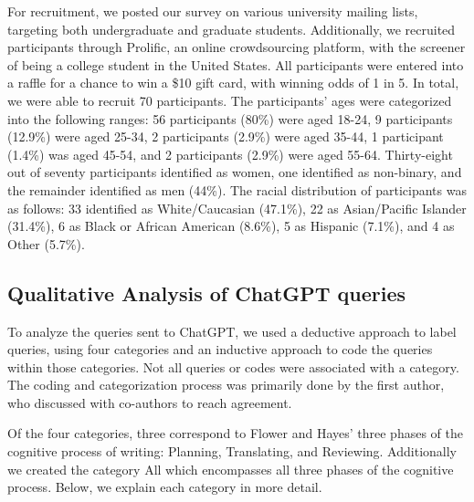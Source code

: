 \documentclass[manuscript,screen,acmsmall]{acmart}
\begin{document}
For recruitment, we posted our survey on various university mailing lists, targeting both undergraduate and graduate students. Additionally, we recruited participants through Prolific, an online crowdsourcing platform, with the screener of being a college student in the United States. All participants were entered into a raffle for a chance to win a \$10 gift card, with winning odds of 1 in 5. In total, we were able to recruit 70 participants. 
The participants' ages were categorized into the following ranges: 56 participants (80\%) were aged 18-24, 9 participants (12.9\%) were aged 25-34, 2 participants (2.9\%) were aged 35-44, 1 participant (1.4\%) was aged 45-54, and 2 participants (2.9\%) were aged 55-64.
Thirty-eight out of seventy participants identified as women, one identified as non-binary, and the remainder identified as men (44\%).
The racial distribution of participants was as follows: 33 identified as White/Caucasian (47.1\%), 22 as Asian/Pacific Islander (31.4\%), 6 as Black or African American (8.6\%), 5 as Hispanic (7.1\%), and 4 as Other (5.7\%).










\subsection{Qualitative Analysis of ChatGPT queries}
\label{sec:query-cats}

To analyze the queries sent to ChatGPT, we used a deductive approach to label queries, using four categories and an inductive approach to code the queries within those categories.
Not all queries or codes were associated with a category.
The coding and categorization process was primarily done by the first author, who discussed with co-authors to reach agreement. 

Of the four categories, three correspond to Flower and Hayes' three phases of the cognitive process of writing: Planning, Translating, and Reviewing.
Additionally we created the category All which encompasses all three phases of the cognitive process.
Below, we explain each category in more detail.
\end{document}
